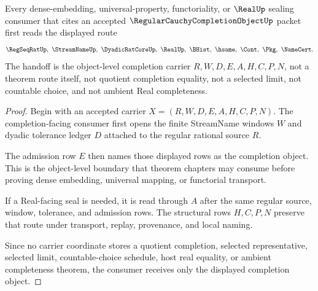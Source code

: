\begin{theorem}
\label{thm:regular-cauchy-completion-object-dense-embedding-handoff}
Every dense-embedding, universal-property, functoriality, or $\RealUp$ sealing consumer that cites an accepted $\RegularCauchyCompletionObjectUp$ packet first reads the displayed route
$$
\RegSeqRatUp,\ \StreamNameUp,\ \DyadicRatCoreUp,\ \RealUp,\ \BHist,\ \hsame,\ \Cont,\ \Pkg,\ \NameCert .
$$
The handoff is the object-level completion carrier $R,W,D,E,A,H,C,P,N$, not a theorem route itself, not quotient completion equality, not a selected limit, not countable choice, and not ambient Real completeness.
\end{theorem}
\begin{proof}
Begin with an accepted carrier $X=(R,W,D,E,A,H,C,P,N)$. The completion-facing consumer first opens the finite StreamName windows $W$ and dyadic tolerance ledger $D$ attached to the regular rational source $R$.

The admission row $E$ then names those displayed rows as the completion object. This is the object-level boundary that theorem chapters may consume before proving dense embedding, universal mapping, or functorial transport.

If a Real-facing seal is needed, it is read through $A$ after the same regular source, window, tolerance, and admission rows. The structural rows $H,C,P,N$ preserve that route under transport, replay, provenance, and local naming.

Since no carrier coordinate stores a quotient completion, selected representative, selected limit, countable-choice schedule, host real equality, or ambient completeness theorem, the consumer receives only the displayed completion object.
\end{proof}



